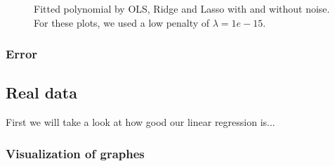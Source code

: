 \begin{figure} [H]
    \caption{Fitted polynomial by OLS, Ridge and Lasso with and without noise. For these plots, we used a low penalty of $\lambda=1e-15$.}%
    \label{fig:example}%
\end{figure}

\restoregeometry

\subsubsection{Error}


\subsection{Real data}
First we will take a look at how good our linear regression is...
\subsubsection{Visualization of graphes}

